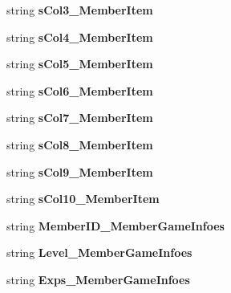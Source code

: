 \begin{DoxyCompactItemize}
\item 
string {\bfseries s\+Col3\+\_\+\+Member\+Item}\hypertarget{a00102_ae7522368c9c414e004e0aab17be86174}{}\label{a00102_ae7522368c9c414e004e0aab17be86174}

\item 
string {\bfseries s\+Col4\+\_\+\+Member\+Item}\hypertarget{a00102_ab56fb54f21cfa61269b56030b66139f8}{}\label{a00102_ab56fb54f21cfa61269b56030b66139f8}

\item 
string {\bfseries s\+Col5\+\_\+\+Member\+Item}\hypertarget{a00102_a608d4dfd50f04b835a4e15e6f164d3ba}{}\label{a00102_a608d4dfd50f04b835a4e15e6f164d3ba}

\item 
string {\bfseries s\+Col6\+\_\+\+Member\+Item}\hypertarget{a00102_a8982cb12f9e956162543accf7f581489}{}\label{a00102_a8982cb12f9e956162543accf7f581489}

\item 
string {\bfseries s\+Col7\+\_\+\+Member\+Item}\hypertarget{a00102_a0846fb501374a13a3adeac544feae863}{}\label{a00102_a0846fb501374a13a3adeac544feae863}

\item 
string {\bfseries s\+Col8\+\_\+\+Member\+Item}\hypertarget{a00102_a6f5243aee324d14e1ff3c637f954bd4b}{}\label{a00102_a6f5243aee324d14e1ff3c637f954bd4b}

\item 
string {\bfseries s\+Col9\+\_\+\+Member\+Item}\hypertarget{a00102_a19af1c5fbc6257e77b541a23d8bd0a19}{}\label{a00102_a19af1c5fbc6257e77b541a23d8bd0a19}

\item 
string {\bfseries s\+Col10\+\_\+\+Member\+Item}\hypertarget{a00102_aab6badf69b606c6262ca67fd2285b8a6}{}\label{a00102_aab6badf69b606c6262ca67fd2285b8a6}

\item 
string {\bfseries Member\+I\+D\+\_\+\+Member\+Game\+Infoes}\hypertarget{a00102_a764806cad0f924219f2f7c6a183e2e72}{}\label{a00102_a764806cad0f924219f2f7c6a183e2e72}

\item 
string {\bfseries Level\+\_\+\+Member\+Game\+Infoes}\hypertarget{a00102_a45729bb7b0ddecd97226184ea10154f9}{}\label{a00102_a45729bb7b0ddecd97226184ea10154f9}

\item 
string {\bfseries Exps\+\_\+\+Member\+Game\+Infoes}\hypertarget{a00102_a935492fbae9a79f3dd8d61f0da4eb3e1}{}\label{a00102_a935492fbae9a79f3dd8d61f0da4eb3e1}


\end{DoxyCompactItemize}

